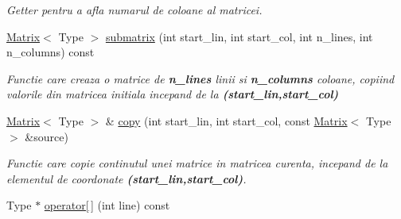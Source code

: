 \begin{DoxyCompactItemize}
\begin{DoxyCompactList}\small\item\em Getter pentru a afla numarul de coloane al matricei. \end{DoxyCompactList}\item 
\hyperlink{classMatrix}{Matrix}$<$ Type $>$ \hyperlink{classMatrix_a0402527771ceae198c876ffb23cce1c6}{submatrix} (int start\_\-lin, int start\_\-col, int n\_\-lines, int n\_\-columns) const 
\begin{DoxyCompactList}\small\item\em Functie care creaza o matrice de {\bfseries n\_\-lines} linii si {\bfseries n\_\-columns} coloane, copiind valorile din matricea initiala incepand de la {\bfseries (start\_\-lin,start\_\-col)} \end{DoxyCompactList}\item 
\hyperlink{classMatrix}{Matrix}$<$ Type $>$ \& \hyperlink{classMatrix_ae186d4ba278c7c953cba1c86f016a78b}{copy} (int start\_\-lin, int start\_\-col, const \hyperlink{classMatrix}{Matrix}$<$ Type $>$ \&source)
\begin{DoxyCompactList}\small\item\em Functie care copie continutul unei matrice in matricea curenta, incepand de la elementul de coordonate {\bfseries (start\_\-lin,start\_\-col)}. \end{DoxyCompactList}\item 
\hypertarget{classMatrix_aee246cf6d811890281f4189277e48fae}{
Type $\ast$ \hyperlink{classMatrix_aee246cf6d811890281f4189277e48fae}{operator\mbox{[}$\,$\mbox{]}} (int line) const }
\label{classMatrix_aee246cf6d811890281f4189277e48fae}


\end{DoxyCompactItemize}
